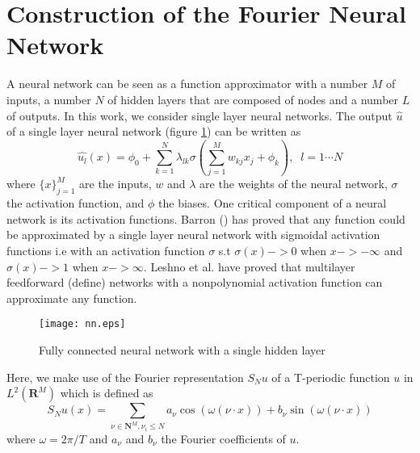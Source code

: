 \documentclass[11pt]{article}
\begin{document}
\section{Construction of the Fourier Neural Network}
A neural network can be seen as a function approximator with a number $M$ of inputs, a number $N$ of hidden layers that are composed of nodes and a number $L$ of outputs. In this work, we consider single layer neural networks. The output $\hat{u}$ of a single layer neural network (figure \ref{fig:NN_single}) can be written as
\begin{equation}\label{NN}
  \hat{u_l}(x) = \phi_0 + \sum_{k = 1}^N \lambda_{lk} \sigma\left(\sum_{j = 1}^M w_{kj}x_j + \phi_k \right), \;\; l=1 \cdots N
\end{equation}
where $\{x\}_{j = 1}^M$ are the inputs, $w$ and $\lambda$ are the weights of the neural network, $\sigma$ the activation function, and $\phi$ the biases. One critical component of a neural network is its activation functions. Barron (\cite{Barron}) has proved that any function could be approximated by a single layer neural network with sigmoidal activation functions i.e with an activation function $\sigma$ s.t $\sigma(x) -> 0$ when $x -> -\infty$ and $\sigma(x) -> 1$ when $x -> \infty$. Leshno et al. \cite{Leshno} have proved that multilayer feedforward (define) networks with a nonpolynomial activation function can approximate any function. \\
\begin{figure}[htb]
    \centering
    \texttt{[image: nn.eps]}
    \caption{Fully connected neural network with a single hidden layer}
    \label{fig:NN_single}
\end{figure}
Here, we make use of the Fourier representation $S_N u$ of a T-periodic function $u$ in $L^2(\mathbf R^M)$ which is defined as
\begin{equation}\label{fourier}
    S_{N}u(x) = \sum_{\nu \in \mathbf{N}^M, \nu_{i}\leq N} a_{\nu} \cos(\omega (\nu\cdot x)) + b_{\nu} \sin(\omega(\nu\cdot x)) 
\end{equation}
where $\omega = 2\pi/T$ and $a_{\nu}$ and $b_{\nu}$ the Fourier coefficients of $u$. 
\end{document}
